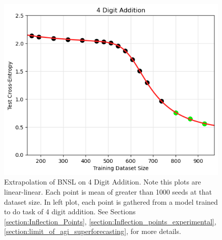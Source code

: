 \documentclass{article} %
\begin{document}
\begin{figure}[htbp]
    \centering


\includegraphics[width=1.0\textwidth]{figures/arithmetic/4_digit_addition__dataset_size.png}
\vspace{-4.7mm}
    \caption{
    Extrapolation of BNSL on 4 Digit Addition. Note this plots are linear-linear. Each point is mean of greater than 1000 seeds at that dataset size. In left plot, each point is gathered from a model trained to do task of 4 digit addition. See Sections \ref{section:Inflection_Points}, \ref{section:Inflection_points_experimental}, \ref{section:limit_of_agi_superforecasting}, for more details.
    }
    \label{fig:arithmetic}
\end{figure}
\vspace{-3.0mm}


\FloatBarrier

\vspace{-2.0mm}
\end{document}
